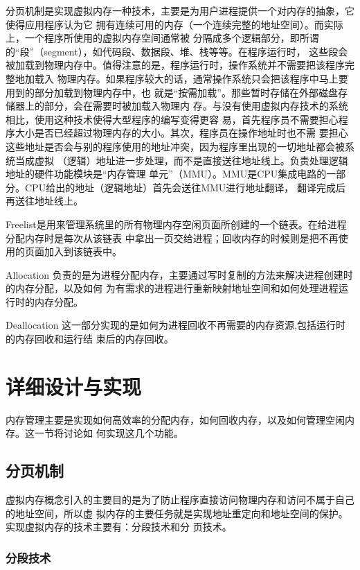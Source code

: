 \documentclass{swfcthesismscctex}
\begin{document}
分页机制是实现虚拟内存一种技术，主要是为用户进程提供一个对内存的抽象，它使得应用程序认为它
拥有连续可用的内存（一个连续完整的地址空间）。而实际上，一个程序所使用的虚拟内存空间通常被
分隔成多个逻辑部分，即所谓的``段''（segment），如代码段、数据段、堆、栈等等。在程序运行时，
这些段会被加载到物理内存中。值得注意的是，程序运行时，操作系统并不需要把该程序完整地加载入
物理内存。如果程序较大的话，通常操作系统只会把该程序中马上要用到的部分加载到物理内存中，也
就是``按需加载''。那些暂时存储在外部磁盘存储器上的部分，会在需要时被加载入物理内
存\cite{Bhat2017}。与没有使用虚拟内存技术的系统相比，使用这种技术使得大型程序的编写变得更容
易，首先程序员不需要担心程序大小是否已经超过物理内存的大小。其次，程序员在操作地址时也不需
要担心这些地址是否会与别的程序使用的地址冲突，因为程序里出现的一切地址都会被系统当成虚拟
（逻辑）地址进一步处理，而不是直接送往地址线上。负责处理逻辑地址的硬件功能模块是``内存管理
单元''（MMU）。MMU是CPU集成电路的一部分。CPU给出的地址（逻辑地址）首先会送往MMU进行地址翻译，
翻译完成后再送往地址线上\cite{abhishek2002memory,Thompson78uniximplementation}。

Freelist是用来管理系统里的所有物理内存空闲页面所创建的一个链表。在给进程分配内存时是每次从该链表
中拿出一页交给进程；回收内存的时候则是把不再使用的页面加入到该链表中。

Allocation 负责的是为进程分配内存，主要通过写时复制的方法来解决进程创建时的内存分配，以及如何
为有需求的进程进行重新映射地址空间和如何处理进程运行时的内存分配。

Deallocation 这一部分实现的是如何为进程回收不再需要的内存资源,包括运行时的内存回收和运行结
束后的内存回收。

\section{详细设计与实现}

内存管理主要是实现如何高效率的分配内存，如何回收内存，以及如何管理空闲内存。这一节将讨论如
何实现这几个功能。

\subsection{分页机制}

虚拟内存概念引入的主要目的是为了防止程序直接访问物理内存和访问不属于自己的地址空间，所以虚
拟内存的主要任务就是实现地址重定向和地址空间的保护。实现虚拟内存的技术主要有：分段技术和分
页技术。

\subsubsection{分段技术}
\end{document}
